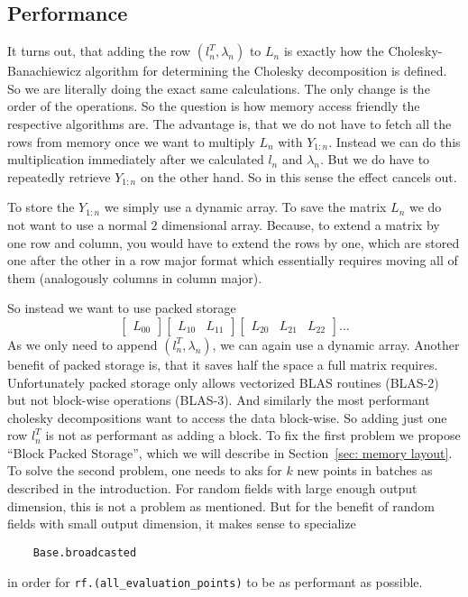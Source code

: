 \subsection{Performance}

It turns out, that adding the row \((l_n^T ,\lambda_n)\) to \(L_n\) is exactly
how the Cholesky-Banachiewicz algorithm for determining the Cholesky
decomposition is defined. So we are literally doing the exact same calculations.
The only change is the order of the operations. So the question is how memory
access friendly the respective algorithms are. The advantage is, that we do not
have to fetch all the rows from memory once we want to multiply
\(L_n\) with \(Y_{1:n}\). Instead we can do this multiplication immediately after
we calculated \(l_n\) and \(\lambda_n\). But we do have to repeatedly retrieve
\(Y_{1:n}\) on the other hand. So in this sense the effect cancels out.

To store the \(Y_{1:n}\) we simply use a dynamic array. To save the matrix \(L_n\)
we do not want to use a normal \(2\) dimensional array. Because, to extend a
matrix by one row and column, you would have to extend the rows by one, which
are stored one after the other in a row major format which essentially
requires moving all of them (analogously columns in column major).

So instead we want to use packed storage
\[
	\begin{bmatrix}
		L_{00}	
	\end{bmatrix}
	\begin{bmatrix}
		L_{10} & L_{11}
	\end{bmatrix}
	\begin{bmatrix}
		L_{20} & L_{21} & L_{22}
	\end{bmatrix}
	\dots
\]
As we only need to append \((l_n^T, \lambda_n)\), we can again use a dynamic
array. Another benefit of packed storage is, that it saves half the space a
full matrix requires. Unfortunately packed storage only allows vectorized BLAS routines
(BLAS-2) but not block-wise operations (BLAS-3). And similarly the most performant
cholesky decompositions want to access the data block-wise. So adding just one
row \(l_n^T\) is not as performant as adding a block. To fix the first problem
we propose ``Block Packed Storage'', which we will describe in Section~\ref{sec: memory
layout}. To solve the second problem, one needs to aks for \(k\) new points in
batches as described in the introduction. For random fields with large enough
output dimension, this is not a problem as mentioned. But for the benefit of
random fields with small output dimension, it makes sense to specialize
\begin{verbatim}
	Base.broadcasted
\end{verbatim}
in order for \texttt{rf.(all_evaluation_points)} to be as performant
as possible.

